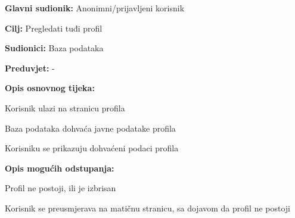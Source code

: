 \noindent {}
\begin{packed_item}

\item \textbf{Glavni sudionik:} Anonimni/prijavljeni korisnik
\item  \textbf{Cilj:} Pregledati tuđi profil
\item  \textbf{Sudionici:} Baza podataka
\item  \textbf{Preduvjet:} -
\item  \textbf{Opis osnovnog tijeka:}

\item[] \begin{packed_enum}

    \item Korisnik ulazi na stranicu profila
    \item Baza podataka dohvaća javne podatake profila
    \item Korisniku se prikazuju dohvaćeni podaci profila

\end{packed_enum}

\item  \textbf{Opis mogućih odstupanja:}

\item[] \begin{packed_item}

    \item[2.a] Profil ne postoji, ili je izbrisan

    \item[] \begin{packed_enum}

        \item Korisnik se preusmjerava na matičnu stranicu, sa dojavom da profil ne postoji

    \end{packed_enum}

\end{packed_item}

\end{packed_item}


